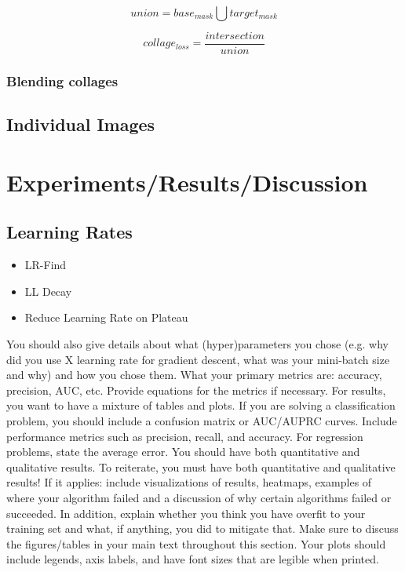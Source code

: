\documentclass{article}
\begin{document}
\begin{equation}
union = base_{mask} \bigcup target_{mask}
\end{equation}


\begin{equation}
collage_{loss} = \frac{intersection}{union}
\end{equation}






\subsubsection{Blending collages}

\subsection{Individual Images}

\section{Experiments/Results/Discussion}

\subsection{Learning Rates}

\begin{itemize}
    \item LR-Find
    \item LL Decay
    \item Reduce Learning Rate on Plateau
\end{itemize}






You should also give details about what (hyper)parameters you chose (e.g. why did you
use X learning rate for gradient descent, what was your mini-batch size and why) and how
you chose them. What your primary metrics are: accuracy, precision,
AUC, etc. Provide equations for the metrics if necessary. For results, you want to have a
mixture of tables and plots. If you are solving a classification problem, you should include a
confusion matrix or AUC/AUPRC curves. Include performance metrics such as precision,
recall, and accuracy. For regression problems, state the average error. You should have
both quantitative and qualitative results. To reiterate, you must have both quantitative
and qualitative results! If it applies: include visualizations of results, heatmaps,
examples of where your algorithm failed and a discussion of why certain algorithms failed
or succeeded. In addition, explain whether you think you have overfit to your training set
and what, if anything, you did to mitigate that. Make sure to discuss the figures/tables in
your main text throughout this section. Your plots should include legends, axis labels, and
have font sizes that are legible when printed.
\end{document}
